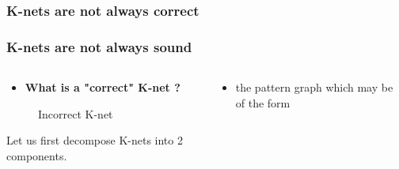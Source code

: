 \documentclass{beamer}
\begin{document}
\subsubsection{K-nets are not always correct}
\begin{frame}[fragile]
	\frametitle{K-nets are not always sound}
	\begin{columns}
		\begin{column}{0.4\textwidth}
			\begin{itemize}
				\item \textbf{What is a "correct" K-net ?}
			\end{itemize}
			\begin{figure}
				\centering

				\caption{Incorrect K-net}
				\label{fig:KAminor}
			\end{figure}
			Let us first decompose K-nets into 2 components.

		\end{column}
		\pause
		\begin{column}{0.65\textwidth}
			\begin{itemize}
				\item the pattern graph which may be of the form
			\end{itemize}
			\begin{figure}
				\centering

				\begin{tikzpicture}


\end{tikzpicture}
\end{figure}
\end{column}
\end{columns}
\end{frame}
\end{document}
